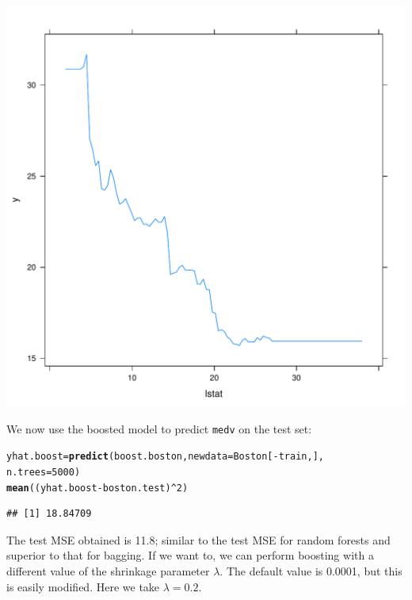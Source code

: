 \documentclass[12pt]{article}\usepackage[]{graphicx}\usepackage[]{color}
\makeatletter
\def\maxwidth{ %
  \ifdim\Gin@nat@width>\linewidth
    \linewidth
  \else
    \Gin@nat@width
  \fi
}
\newcommand{\hlnum}[1]{\textcolor[rgb]{0.686,0.059,0.569}{#1}}%
\newcommand{\hlopt}[1]{\textcolor[rgb]{0,0,0}{#1}}%
\newcommand{\hlstd}[1]{\textcolor[rgb]{0.345,0.345,0.345}{#1}}%
\newcommand{\hlkwb}[1]{\textcolor[rgb]{0.69,0.353,0.396}{#1}}%
\newcommand{\hlkwc}[1]{\textcolor[rgb]{0.333,0.667,0.333}{#1}}%
\newcommand{\hlkwd}[1]{\textcolor[rgb]{0.737,0.353,0.396}{\textbf{#1}}}%
\newenvironment{kframe}{%
 \def\at@end@of@kframe{}%
 \ifinner\ifhmode%
  \def\at@end@of@kframe{\end{minipage}}%
  \begin{minipage}{\columnwidth}%
 \fi\fi%
 \def\FrameCommand##1{\hskip\@totalleftmargin \hskip-\fboxsep
 \colorbox{shadecolor}{##1}\hskip-\fboxsep
     \hskip-\linewidth \hskip-\@totalleftmargin \hskip\columnwidth}%
 \MakeFramed {\advance\hsize-\width
   \@totalleftmargin\z@ \linewidth\hsize
   \@setminipage}}%
 {\par\unskip\endMakeFramed%
 \at@end@of@kframe}
\newenvironment{knitrout}{}{} %
\makeatother
\begin{document}
\begin{knitrout}
\includegraphics[width=\maxwidth]{figure/unnamed-chunk-26-2} 

\end{knitrout}

We now use the boosted model to predict \texttt{medv} on the test set:

\begin{knitrout}
\color{fgcolor}\begin{kframe}
\begin{alltt}
\hlstd{yhat.boost}\hlkwb{=}\hlkwd{predict}\hlstd{(boost.boston,} \hlkwc{newdata}\hlstd{=Boston[}\hlopt{-}\hlstd{train,],}
                   \hlkwc{n.trees}\hlstd{=}\hlnum{5000}\hlstd{)}
\hlkwd{mean}\hlstd{((yhat.boost}\hlopt{-}\hlstd{boston.test)}\hlopt{^}\hlnum{2}\hlstd{)}
\end{alltt}
\begin{verbatim}
## [1] 18.84709
\end{verbatim}
\end{kframe}
\end{knitrout}

The test MSE obtained is 11.8; similar to the test MSE for random forests and superior to that for bagging. If we want to, we can perform boosting with a different value of the shrinkage parameter $\lambda$. The default value is 0.0001, but this is easily modified. Here we take $\lambda = 0.2$.
\end{document}
